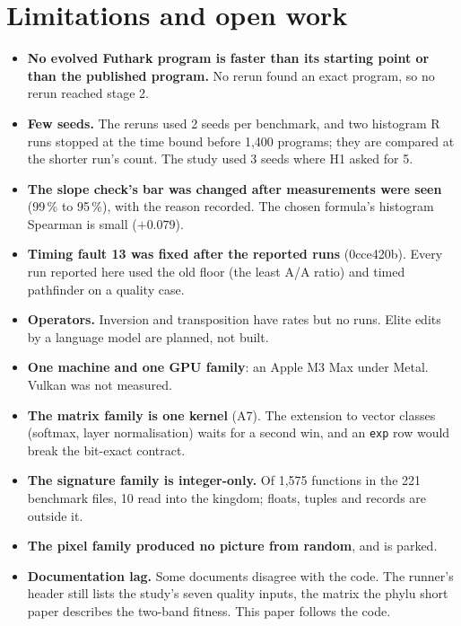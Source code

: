 \documentclass[sigconf,nonacm]{acmart}
\begin{document}
\section{Limitations and open work}
\begin{itemize}
\item \textbf{No evolved Futhark program is faster than its starting point or
  than the published program.} No rerun found an exact program, so no rerun
  reached stage 2.
\item \textbf{Few seeds.} The reruns used 2 seeds per benchmark, and two
  histogram R runs stopped at the time bound before 1,400 programs; they are
  compared at the shorter run's count. The study used 3 seeds where H1 asked
  for 5.
\item \textbf{The slope check's bar was changed after measurements were seen}
  (99\,\% to 95\,\%), with the reason recorded. The chosen formula's histogram
  Spearman is small ($+0.079$).
\item \textbf{Timing fault 13 was fixed after the reported runs} (0cce420b).
  Every run reported here used the old floor (the least A/A ratio) and timed
  pathfinder on a quality case.
\item \textbf{Operators.} Inversion and transposition have rates but no runs.
  Elite edits by a language model are planned, not built.
\item \textbf{One machine and one GPU family}: an Apple M3 Max under Metal.
  Vulkan was not measured.
\item \textbf{The matrix family is one kernel} (A7). The extension to vector
  classes (softmax, layer normalisation) waits for a second win, and an
  \texttt{exp} row would break the bit-exact contract.
\item \textbf{The signature family is integer-only.} Of 1,575 functions in the
  221 benchmark files, 10 read into the kingdom; floats, tuples and records are
  outside it.
\item \textbf{The pixel family produced no picture from random}, and is parked.
\item \textbf{Documentation lag.} Some documents disagree with the code. The
  runner's header still lists the study's seven quality inputs, the matrix
  the phylu short paper describes the two-band fitness. This paper follows the code.
\end{itemize}

\end{document}

